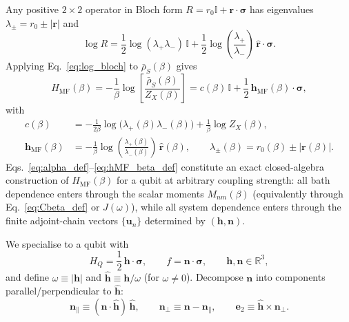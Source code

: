 Any positive $2\times 2$ operator in Bloch form
$R=r_0\mathbb I+\mathbf r\cdot\boldsymbol\sigma$ has eigenvalues
$\lambda_\pm=r_0\pm|\mathbf r|$ and
\begin{equation}
    \log R
    =
    \frac12\log(\lambda_+\lambda_-)\,\mathbb I
    +
    \frac12\log\!\left(\frac{\lambda_+}{\lambda_-}\right)\,
    \hat{\mathbf r}\cdot\boldsymbol\sigma.
    \label{eq:log_bloch}
\end{equation}
Applying Eq.~\eqref{eq:log_bloch} to $\bar\rho_S(\beta)$ gives
\begin{equation}
    H_{\mathrm{MF}}(\beta)
    =
    -\frac{1}{\beta}\log\!\left[\frac{\bar\rho_S(\beta)}{Z_X(\beta)}\right]
    =
    c(\beta)\,\mathbb I
    +
    \frac12\,\mathbf h_{\mathrm{MF}}(\beta)\cdot\boldsymbol\sigma,
    \label{eq:HMF_qubit_form}
\end{equation}
with
\begin{align}
    c(\beta)
    &=
    -\frac{1}{2\beta}\log\!\big(\lambda_+(\beta)\lambda_-(\beta)\big)
    +\frac{1}{\beta}\log Z_X(\beta),
    \label{eq:c_beta_def}\\
    \mathbf h_{\mathrm{MF}}(\beta)
    &=
    -\frac{1}{\beta}\log\!\left(\frac{\lambda_+(\beta)}{\lambda_-(\beta)}\right)\,
    \hat{\mathbf r}(\beta),
    \qquad
    \lambda_\pm(\beta)=r_0(\beta)\pm|\mathbf r(\beta)|.
    \label{eq:hMF_beta_def}
\end{align}
Eqs.~\eqref{eq:alpha_def}--\eqref{eq:hMF_beta_def} constitute an exact closed-algebra construction of
$H_{\mathrm{MF}}(\beta)$ for a qubit at arbitrary coupling strength: all bath dependence enters through the scalar moments
$M_{nm}(\beta)$ (equivalently through Eq.~\eqref{eq:Cbeta_def} or $J(\omega)$), while all system dependence enters through the finite adjoint-chain
vectors $\{\mathbf u_n\}$ determined by $(\mathbf h,\mathbf n)$.



We specialise to a qubit with
\begin{equation}
    H_Q=\frac{1}{2}\,\mathbf h\cdot\boldsymbol\sigma,
    \qquad
    f=\mathbf n\cdot\boldsymbol\sigma,
    \qquad
    \mathbf h,\mathbf n\in\mathbb R^3,
\end{equation}
and define $\omega\equiv|\mathbf h|$ and $\hat{\mathbf h}\equiv\mathbf h/\omega$ (for $\omega\neq 0$).
Decompose $\mathbf n$ into components parallel/perpendicular to $\hat{\mathbf h}$:
\begin{equation}
    \mathbf n_\parallel \equiv (\mathbf n\cdot\hat{\mathbf h})\,\hat{\mathbf h},
    \qquad
    \mathbf n_\perp \equiv \mathbf n-\mathbf n_\parallel,
    \qquad
    \mathbf e_2 \equiv \hat{\mathbf h}\times \mathbf n_\perp.
\end{equation}


